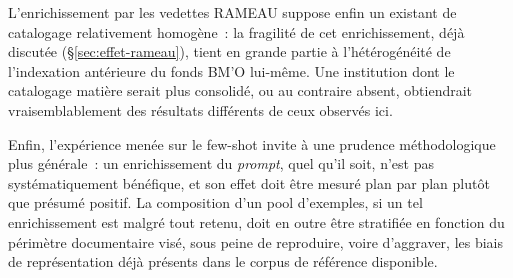L'enrichissement par les vedettes RAMEAU suppose enfin un existant de catalogage relativement homogène~: la fragilité de cet enrichissement, déjà discutée (\S\ref{sec:effet-rameau}), tient en grande partie à l'hétérogénéité de l'indexation antérieure du fonds BM'O lui-même. Une institution dont le catalogage matière serait plus consolidé, ou au contraire absent, obtiendrait vraisemblablement des résultats différents de ceux observés ici.

Enfin, l'expérience menée sur le few-shot invite à une prudence méthodologique plus générale~: un enrichissement du \textit{prompt}, quel qu'il soit, n'est pas systématiquement bénéfique, et son effet doit être mesuré plan par plan plutôt que présumé positif. La composition d'un pool d'exemples, si un tel enrichissement est malgré tout retenu, doit en outre être stratifiée en fonction du périmètre documentaire visé, sous peine de reproduire, voire d'aggraver, les biais de représentation déjà présents dans le corpus de référence disponible.
